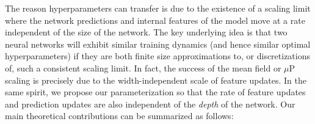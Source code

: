 \documentclass{article} %
\begin{document}
% 
% 
% 
The reason hyperparameters can transfer is due to the existence of a scaling limit where the network predictions and internal features of the model move at a rate independent of the size of the network. 
% 
The key underlying idea is that two neural networks will exhibit similar training dynamics (and hence similar optimal hyperparameters) if they are both finite size approximations to, or discretizations of, such a consistent scaling limit. 
% 
In fact, the success of the mean field or $\mu$P scaling \citep{yang2021tensor,bordelon2022self} is precisely due to the width-independent scale of feature updates. %
% 
In the same spirit, we propose our parameterization so that the rate of feature updates and prediction updates are also independent of the \textit{depth} of the network. 
% 
% 
% 
% 
% 
Our main theoretical contributions can be summarized as follows:
% 
\end{document}
